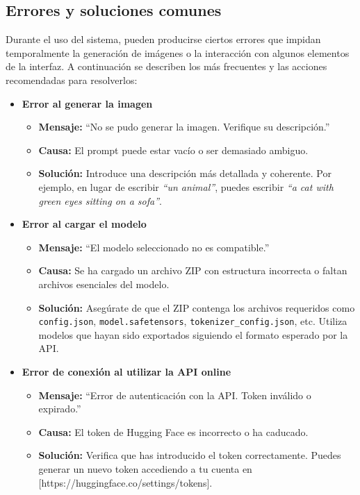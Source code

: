 \subsection{Errores y soluciones comunes}

Durante el uso del sistema, pueden producirse ciertos errores que impidan temporalmente la generación de imágenes o la interacción con algunos elementos de la interfaz. A continuación se describen los más frecuentes y las acciones recomendadas para resolverlos:

\begin{itemize}
\item \textbf{Error al generar la imagen}
\begin{itemize}
\item \textbf{Mensaje:} ``No se pudo generar la imagen. Verifique su descripción.''
\item \textbf{Causa:} El prompt puede estar vacío o ser demasiado ambiguo.
\item \textbf{Solución:} Introduce una descripción más detallada y coherente. Por ejemplo, en lugar de escribir \textit{“un animal”}, puedes escribir \textit{“a cat with green eyes sitting on a sofa”}.
\end{itemize}
\item \textbf{Error al cargar el modelo}  
\begin{itemize}
    \item \textbf{Mensaje:} ``El modelo seleccionado no es compatible.''
    \item \textbf{Causa:} Se ha cargado un archivo ZIP con estructura incorrecta o faltan archivos esenciales del modelo.
    \item \textbf{Solución:} Asegúrate de que el ZIP contenga los archivos requeridos como \texttt{config.json}, \texttt{model.safetensors}, \texttt{tokenizer\_config.json}, etc. Utiliza modelos que hayan sido exportados siguiendo el formato esperado por la API.
\end{itemize}

\item \textbf{Error de conexión al utilizar la API online}  
\begin{itemize}
    \item \textbf{Mensaje:} ``Error de autenticación con la API. Token inválido o expirado.''
    \item \textbf{Causa:} El token de Hugging Face es incorrecto o ha caducado.
    \item \textbf{Solución:} Verifica que has introducido el token correctamente. Puedes generar un nuevo token accediendo a tu cuenta en [https://huggingface.co/settings/tokens].
\end{itemize}


\end{itemize}
